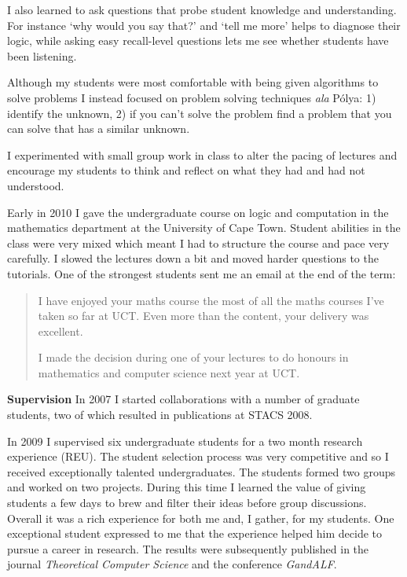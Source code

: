 \documentclass[12pt]{article}
\theoremstyle{plain} \numberwithin{equation}{section}
\theoremstyle{definition}
\begin{document}
I also learned to ask questions that probe student knowledge and understanding. For instance `why would you say that?' and `tell me more' helps to diagnose their logic, while asking easy recall-level questions lets me see whether students have been listening.

Although my students were most comfortable with being given algorithms to solve problems I instead focused on problem solving techniques {\it ala} P\'olya: 1) identify the unknown, 2) if you can't solve the problem find a problem that you can solve that has a similar unknown. 

I experimented with small group work in class to alter the pacing of lectures and encourage my students to think and reflect on what they had and had not understood.


Early in 2010 I gave the undergraduate course on logic and computation in the mathematics department at the University of Cape Town. Student abilities in the class were very mixed which meant I had to structure the course and pace very carefully. I slowed the lectures down a bit and moved harder questions to the tutorials. One of the strongest students sent me an email at the end of the term:
\begin{quote}
I have enjoyed your maths course the most of all the maths courses I've taken so far at UCT. Even more than the content, your delivery was excellent.

I made the decision during one of your lectures to do honours in mathematics and computer science next year at UCT. 
\end{quote}

{\bf Supervision}
In 2007 I started collaborations with a number of graduate students, two of which resulted in publications at STACS 2008.

In 2009 I supervised six undergraduate students for a two month research experience (REU). The student selection process was very competitive and so I received exceptionally talented undergraduates. The students formed two groups and worked on two projects. During this time I learned the value of giving students a few days to brew and filter their ideas before group discussions. Overall it was a rich experience for both me and, I gather, for my students. One exceptional student expressed to me that the experience helped him decide to pursue a career in research. 
The results were subsequently published in the journal {\em Theoretical Computer Science} and the conference {\em GandALF}.
\end{document}

